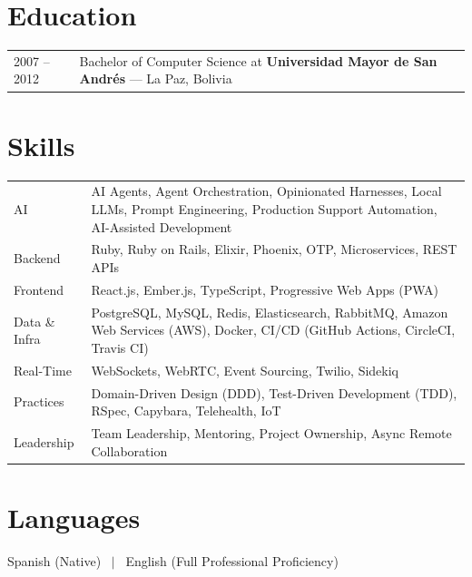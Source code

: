 \documentclass[a4paper,12pt]{article}
\begin{document}
\section{Education}
\begin{tabularx}{\linewidth}{@{}l X@{}}
2007 -- 2012 & Bachelor of Computer Science at \textbf{Universidad Mayor de San Andr\'es} --- La Paz, Bolivia \\
\end{tabularx}

\section{Skills}
\begin{tabularx}{\linewidth}{@{}l X@{}}
AI &  \normalsize{AI Agents, Agent Orchestration, Opinionated Harnesses, Local LLMs, Prompt Engineering, Production Support Automation, AI-Assisted Development}\\
Backend &  \normalsize{Ruby, Ruby on Rails, Elixir, Phoenix, OTP, Microservices, REST APIs}\\
Frontend &  \normalsize{React.js, Ember.js, TypeScript, Progressive Web Apps (PWA)}\\
Data \& Infra &  \normalsize{PostgreSQL, MySQL, Redis, Elasticsearch, RabbitMQ, Amazon Web Services (AWS), Docker, CI/CD (GitHub Actions, CircleCI, Travis CI)}\\
Real-Time &  \normalsize{WebSockets, WebRTC, Event Sourcing, Twilio, Sidekiq}\\
Practices &  \normalsize{Domain-Driven Design (DDD), Test-Driven Development (TDD), RSpec, Capybara, Telehealth, IoT}\\
Leadership &  \normalsize{Team Leadership, Mentoring, Project Ownership, Async Remote Collaboration}\\
\end{tabularx}

\section{Languages}
Spanish (Native) \ $|$ \ English (Full Professional Proficiency)

\vfill
{}
\end{document}
